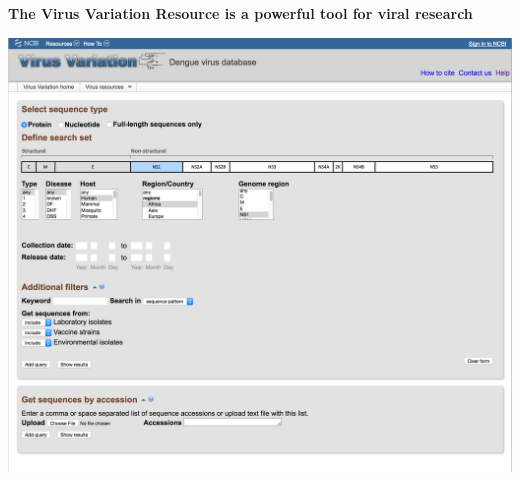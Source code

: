 \documentclass[landscape]{slides}
\begin{document}
\begin{slide}
\begin{center}
\textbf{The Virus Variation Resource is a powerful tool for viral research}

\includegraphics[width=8.5in]{figs/viv-dengue-query}

\vfill
\end{center}
\end{slide}
\end{document}
